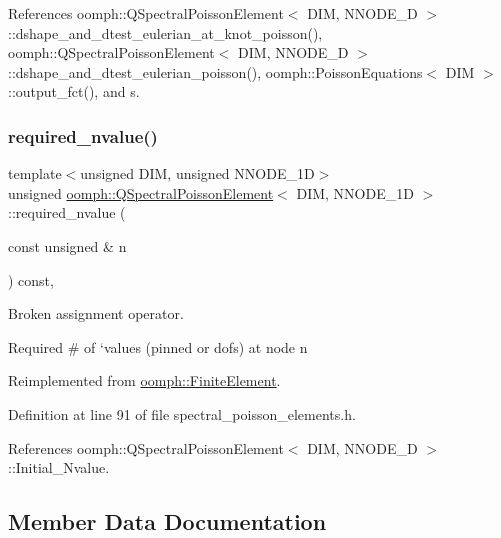 References oomph\+::\+Q\+Spectral\+Poisson\+Element$<$ D\+I\+M, N\+N\+O\+D\+E\+\_\+D $>$\+::dshape\+\_\+and\+\_\+dtest\+\_\+eulerian\+\_\+at\+\_\+knot\+\_\+poisson(), oomph\+::\+Q\+Spectral\+Poisson\+Element$<$ D\+I\+M, N\+N\+O\+D\+E\+\_\+D $>$\+::dshape\+\_\+and\+\_\+dtest\+\_\+eulerian\+\_\+poisson(), oomph\+::\+Poisson\+Equations$<$ D\+I\+M $>$\+::output\+\_\+fct(), and s.

\mbox{\label{classoomph_1_1QSpectralPoissonElement_a6f37168c5ce1065a14b9a2a78df20539}} 
\subsubsection{\texorpdfstring{required\+\_\+nvalue()}{required\_nvalue()}}
{\footnotesize\ttfamily template$<$unsigned D\+IM, unsigned N\+N\+O\+D\+E\+\_\+1D$>$ \\
unsigned \hyperlink{classoomph_1_1QSpectralPoissonElement}{oomph\+::\+Q\+Spectral\+Poisson\+Element}$<$ D\+IM, N\+N\+O\+D\+E\+\_\+1D $>$\+::required\+\_\+nvalue (\begin{DoxyParamCaption}\item[{const unsigned \&}]{n }\end{DoxyParamCaption}) const\hspace{0.3cm}{\ttfamily [inline]}, {\ttfamily [virtual]}}



Broken assignment operator. 

Required \# of `values\textquotesingle{} (pinned or dofs) at node n 

Reimplemented from \hyperlink{classoomph_1_1FiniteElement_a56610c60d5bc2d7c27407a1455471b1a}{oomph\+::\+Finite\+Element}.



Definition at line 91 of file spectral\+\_\+poisson\+\_\+elements.\+h.



References oomph\+::\+Q\+Spectral\+Poisson\+Element$<$ D\+I\+M, N\+N\+O\+D\+E\+\_\+D $>$\+::\+Initial\+\_\+\+Nvalue.



\subsection{Member Data Documentation}
\mbox{\label{classoomph_1_1QSpectralPoissonElement_aaabc5076bdcd68f361cc6d2b76b12608}} 
